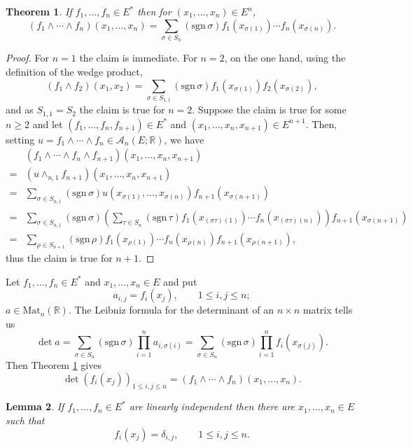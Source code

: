\documentclass{amsart}
\newcommand{\sgn}{\mathrm{sgn}\,}
\newcommand{\Mat}{\mathrm{Mat}}
\newtheorem{theorem}{Theorem}
\newtheorem{lemma}[theorem]{Lemma}
\theoremstyle{definition}
\begin{document}
\begin{theorem}
If $f_1,\ldots,f_n \in E^*$ then for $(x_1,\ldots,x_n) \in E^n$,
\[
(f_1 \wedge \cdots \wedge f_n)(x_1,\ldots,x_n) = \sum_{\sigma \in S_n} (\sgn \sigma) f_1(x_{\sigma(1)}) \cdots f_n(x_{\sigma(n)}).
\]
\label{nwedge}
\end{theorem}
\begin{proof}
For $n=1$ the claim is immediate. For $n=2$,
on the one hand, using the definition of the wedge product,
\[
(f_1 \wedge f_2)(x_1,x_2) =
\sum_{\sigma \in S_{1,1}} (\sgn \sigma) f_1(x_{\sigma(1)}) f_2(x_{\sigma(2)}),
\]
and as $S_{1,1}=S_2$ the claim is true for $n=2$. 
Suppose the claim is true for some $n \geq 2$ 
and let $(f_1,\ldots,f_n,f_{n+1}) \in E^*$ and $(x_1,\ldots,x_n,x_{n+1}) \in E^{n+1}$. Then, setting
$u=f_1 \wedge \cdots \wedge f_n \in \mathscr{A}_n(E;\mathbb{R})$, we have
\[
\begin{split}
&(f_1 \wedge \cdots \wedge f_n \wedge f_{n+1})(x_1,\ldots,x_n,x_{n+1})\\
=&(u \wedge_{n,1} f_{n+1})(x_1,\ldots,x_n,x_{n+1})\\
=&\sum_{\sigma \in S_{n,1}} (\sgn \sigma) u(x_{\sigma(1)},\ldots,x_{\sigma(n)}) f_{n+1}(x_{\sigma(n+1)})\\
=&\sum_{\sigma \in S_{n,1}} (\sgn \sigma) \left( \sum_{\tau \in S_n} (\sgn \tau) f_1(x_{(\sigma \tau)(1)}) \cdots f_n(x_{(\sigma \tau)(n)}) \right) f_{n+1}(x_{\sigma(n+1)})\\
=&\sum_{\rho \in S_{n+1}} (\sgn \rho) f_1(x_{\rho(1)}) \cdots
f_n(x_{\rho(n)}) f_{n+1}(x_{\rho(n+1)}),
\end{split}
\]
thus the claim is true for $n+1$. 
\end{proof}




Let $f_1,\ldots,f_n \in E^*$ and $x_1,\ldots,x_n \in E$ and put
\[
a_{i,j}=f_i(x_j), \qquad 1 \leq i,j \leq n;
\]
$a \in \Mat_n(\mathbb{R})$.
The Leibniz formula for the determinant of an $n \times n$ matrix tells us
\[
\det a=\sum_{\sigma \in S_n} (\sgn \sigma) \prod_{i=1}^n a_{i,\sigma(i)}
=\sum_{\sigma \in S_n} (\sgn \sigma) \prod_{i=1}^n f_i(x_{\sigma(j)}).
\]
Then Theorem \ref{nwedge} gives
\[
\det (f_i(x_j))_{1 \leq i,j \leq n} = (f_1 \wedge \cdots \wedge f_n)(x_1,\ldots,x_n).
\]



\begin{lemma}
If $f_1,\ldots,f_n \in E^*$ are linearly independent then there are
$x_1,\ldots,x_n \in E$ such that
\[
f_i(x_j) = \delta_{i,j},\qquad 1 \leq i,j \leq n.
\]
\label{dualset}
\end{lemma}
\end{document}
